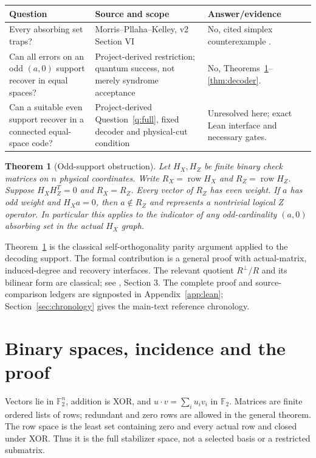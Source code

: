 \documentclass[11pt]{article}
\newtheorem{theorem}{Theorem}
\newcommand{\F}{\mathbb F_2}
\newcommand{\row}{\operatorname{row}}
\begin{document}
\small
\par\noindent
\begin{tabular}{>{\raggedright\arraybackslash}p{}>{\raggedright\arraybackslash}p{}>{\raggedright\arraybackslash}p{}}
\toprule Question & Source and scope & Answer/evidence\\\midrule
Every absorbing set traps? & Morris--Pllaha--Kelley, v2 Section VI & No, cited simplex counterexample \cite{simplex}.\\
Can all errors on an odd $(a,0)$ support recover in equal spaces? & Project-derived restriction; quantum success, not merely syndrome acceptance & No, Theorems~\ref{thm:parity}--\ref{thm:decoder}.\\
Can a suitable even support recover in a connected equal-space code? & Project-derived Question~\ref{q:full}, fixed decoder and physical-cut condition & Unresolved here; exact Lean interface and necessary gates.\\
\bottomrule
\end{tabular}
\normalsize

\begin{theorem}[Odd-support obstruction]\label{thm:parity}
Let $H_X,H_Z$ be finite binary check matrices on $n$ physical coordinates. Write $R_X=\row H_X$ and $R_Z=\row H_Z$. Suppose $H_XH_Z^T=0$ and $R_X=R_Z$. Every vector of $R_Z$ has even weight. If $a$ has odd weight and $H_Xa=0$, then $a\notin R_Z$ and represents a nontrivial logical Z operator. In particular this applies to the indicator of any odd-cardinality $(a,0)$ absorbing set in the actual $H_X$ graph.
\end{theorem}
Theorem~\ref{thm:parity} is the classical self-orthogonality parity argument applied to the decoding support. The formal contribution is a general proof with actual-matrix, induced-degree and recovery interfaces. The relevant quotient $R^\perp/R$ and its bilinear form are classical; see \cite{hhpw}, Section 3. The complete proof and source-comparison ledgers are signposted in Appendix~\ref{app:lean}; Section~\ref{sec:chronology} gives the main-text reference chronology.

\section{Binary spaces, incidence and the proof}
Vectors lie in $\F^n$, addition is XOR, and $u\cdot v=\sum_i u_iv_i$ in $\F$. Matrices are finite ordered lists of rows; redundant and zero rows are allowed in the general theorem. The row space is the least set containing zero and every actual row and closed under XOR. Thus it is the full stabilizer space, not a selected basis or a restricted submatrix.
\end{document}
